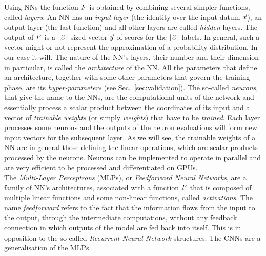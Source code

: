 Using NNs the function $F$ is obtained by combining several simpler functions, called \emph{layers}. An NN has an \emph{input layer} (the identity over the input datum $\vec{x}$), an output layer (the last function) and all other layers are called \emph{hidden} layers.  The output of $F$ is a $\lvert\mathcal{Z}\rvert$-sized vector $\vec{y}$ of scores for the $\lvert\mathcal{Z}\rvert$ labels. In general, such a vector might or not represent the approximation of a probability distribution. In our case it will. The nature of the NN's  layers, their number and their dimension in particular, is called the \emph{architecture} of the NN. All the parameters that define an architecture, together with some other parameters that govern the training phase, are its \emph{hyper-parameters} (see Sec.~\ref{sec:validation}). The so-called \emph{neurons}, that give the name to the NNs, are the computational units of the network and essentially process a scalar product between the coordinates of its input and a vector of  \emph{trainable weights} (or simply \emph{weights}) that have to be \emph{trained}. Each layer processes some neurons and the outputs of the neuron evaluations will form new input vectors for the subsequent layer. As we will see, the trainable weights of a NN are in general those defining the linear operations, which are scalar products processed by the neurons. Neurons can be implemented to operate in parallel and are very efficient to be processed and differentiated on GPUs. \\


The {\em Multi-Layer Perceptrons} (MLPs), or \emph{Feedforward Neural Networks}, are a family of NN's architectures, associated with a function $F$  that is composed of multiple linear functions and some non-linear functions, called {\em activations}. The name \emph{feedforward} refers to the fact that the information flows from  the input to the output, through the intermediate computations, without any feedback connection in which outputs of the model are fed back into itself.  This is in opposition to the so-called \emph{Recurrent Neural Network} structures. The CNNs are a generalisation of the MLPs.  \\

